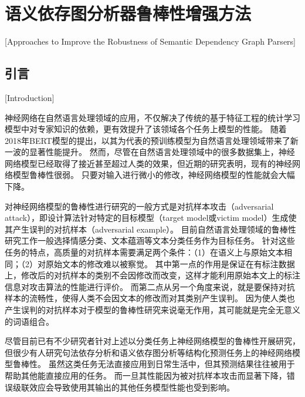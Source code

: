 
\chapter[语义依存图分析器鲁棒性增强方法]{语义依存图分析器鲁棒性增强方法}[Approaches to Improve the Robustness of Semantic Dependency Graph Parsers]

\section{引言}[Introduction]
\label{sec:chapter3-intro}

神经网络在自然语言处理领域的应用，不仅解决了传统的基于特征工程的统计学习模型中对专家知识的依赖，更有效提升了该领域各个任务上模型的性能\cite{chen-manning-2014-fast,chiu-nichols-2016-named,ma-hovy-2016-end,zhou-etal-2016-text,chopra-etal-2016-abstractive}。
随着2018年BERT模型的提出，以其为代表的预训练模型为自然语言处理领域带来了新一波的显著性能提升\cite{peters-etal-2018-deep,devlin-etal-2018-bert,yang-etal-2019-xlnet,clark-etal-2020-electra}。
然而，尽管在自然语言处理领域中的很多数据集上，神经网络模型已经取得了接近甚至超过人类的效果，但近期的研究表明，现有的神经网络模型鲁棒性很弱。
只要对输入进行微小的修改，神经网络模型的性能就会大幅下降\cite{alzantot-etal-2018-generating, ren-etal-2019-generating, cheng-etal-2019-robust,michel-etal-2019-evaluation, jin-etal-2020-isbert}。

对神经网络模型的鲁棒性进行研究的一般方式是对抗样本攻击（adversarial attack），即设计算法针对特定的目标模型（target model或victim model）生成使其产生误判的对抗样本（adversarial example）。
目前自然语言处理领域的鲁棒性研究工作一般选择情感分类、文本蕴涵等文本分类任务作为目标任务。
针对这些任务的特点，高质量的对抗样本需要满足两个条件：（1）在语义上与原始文本相同；（2）对原始文本的修改难以被察觉。
其中第一点的作用是保证在有标注数据上，修改后的对抗样本的类别不会因修改而改变，这样才能利用原始本文上的标注信息对攻击算法的性能进行评价。
而第二点从另一个角度来说，就是要保持对抗样本的流畅性，使得人类不会因文本的修改而对其类别产生误判。
因为使人类也产生误判的对抗样本对于模型的鲁棒性研究来说毫无作用，其可能就是完全无意义的词语组合。

尽管目前已有不少研究者针对上述以分类任务上神经网络模型的鲁棒性开展研究，但很少有人研究句法依存分析和语义依存图分析等结构化预测任务上的神经网络模型鲁棒性。
虽然这类任务无法直接应用到日常生活中，但其预测结果往往被用于帮助其他能直接应用的任务。
而一旦其性能因为被对抗样本攻击而显著下降，错误级联效应会导致使用其输出的其他任务模型性能也受到影响。

